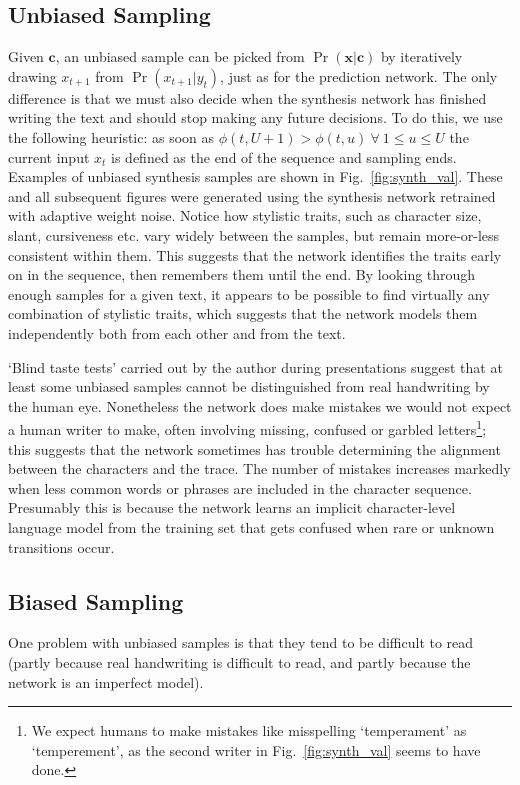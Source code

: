 \subsection{Unbiased Sampling} Given $\mathbf{c}$, an unbiased sample can be picked from $\Pr(\mathbf{x}|\mathbf{c})$ by iteratively drawing $x_{t+1}$ from $\Pr\left(x_{t+1}|y_t\right)$, just as for the prediction network. The only difference is that we must also decide when the synthesis network has finished writing the text and should stop making any future decisions. To do this, we use the following heuristic: as soon as $\phi(t, U+1) > \phi(t, u)\ \forall\ 1 \leq u \leq U$ the current input $x_t$ is defined as the end of the sequence and sampling ends. Examples of unbiased synthesis samples are shown in Fig.~\ref{fig:synth_val}.
These and all subsequent figures were generated using the synthesis network retrained with adaptive weight noise. Notice how stylistic traits, such as character size, slant, cursiveness etc. vary widely between the samples, but remain more-or-less consistent within them. This suggests that the network identifies the traits early on in the sequence, then remembers them until the end. By looking through enough samples for a given text, it appears to be possible to find virtually any combination of stylistic traits, which suggests that the network models them independently both from each other and from the text.

`Blind taste tests' carried out by the author during presentations suggest that at least some unbiased samples cannot be distinguished from real handwriting by the human eye. Nonetheless the network does make mistakes we would not expect a human writer to make, often involving missing, confused or garbled letters\footnote{We expect humans to make mistakes like misspelling `temperament' as `temperement', as the second writer in Fig.~\ref{fig:synth_val} seems to have done.}; this suggests that the network sometimes has trouble determining the alignment between the characters and the trace. The number of mistakes increases markedly when less common words or phrases are included in the character sequence. Presumably this is because the network learns an implicit character-level language model from the training set that gets confused when rare or unknown transitions occur.

\subsection{Biased Sampling} One problem with unbiased samples is that they tend to be difficult to read (partly because real handwriting is difficult to read, and partly because the network is an imperfect model).

